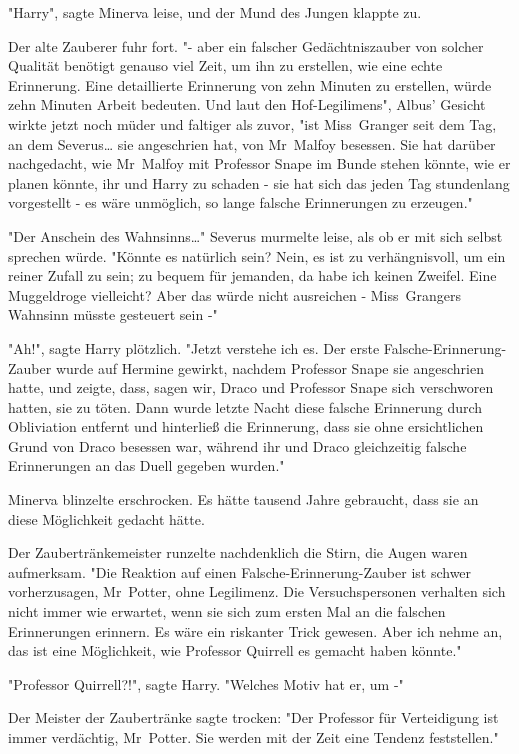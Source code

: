 {"Harry", sagte Minerva leise, und der Mund des Jungen klappte zu.

Der alte Zauberer fuhr fort. "- aber ein falscher Gedächtniszauber von solcher Qualität benötigt genauso viel Zeit, um ihn zu erstellen, wie eine echte Erinnerung. Eine detaillierte Erinnerung von zehn Minuten zu erstellen, würde zehn Minuten Arbeit bedeuten. Und laut den Hof-Legilimens", Albus' Gesicht wirkte jetzt noch müder und faltiger als zuvor, "ist Miss~Granger seit dem Tag, an dem Severus… sie angeschrien hat, von Mr~Malfoy besessen. Sie hat darüber nachgedacht, wie Mr~Malfoy mit Professor Snape im Bunde stehen könnte, wie er planen könnte, ihr und Harry zu schaden - sie hat sich das jeden Tag stundenlang vorgestellt - es wäre unmöglich, so lange falsche Erinnerungen zu erzeugen."

"Der Anschein des Wahnsinns…" Severus murmelte leise, als ob er mit sich selbst sprechen würde. "Könnte es natürlich sein? Nein, es ist zu verhängnisvoll, um ein reiner Zufall zu sein; zu bequem für jemanden, da habe ich keinen Zweifel. Eine Muggeldroge vielleicht? Aber das würde nicht ausreichen - Miss~Grangers Wahnsinn müsste gesteuert sein -"

"Ah!", sagte Harry plötzlich. "Jetzt verstehe ich es. Der erste Falsche-Erinnerung-Zauber wurde auf Hermine gewirkt, nachdem Professor Snape sie angeschrien hatte, und zeigte, dass, sagen wir, Draco und Professor Snape sich verschworen hatten, sie zu töten. Dann wurde letzte Nacht diese falsche Erinnerung durch Obliviation entfernt und hinterließ die Erinnerung, dass sie ohne ersichtlichen Grund von Draco besessen war, während ihr und Draco gleichzeitig falsche Erinnerungen an das Duell gegeben wurden."

Minerva blinzelte erschrocken. Es hätte tausend Jahre gebraucht, dass sie an diese Möglichkeit gedacht hätte.

Der Zaubertränkemeister runzelte nachdenklich die Stirn, die Augen waren aufmerksam. "Die Reaktion auf einen Falsche-Erinnerung-Zauber ist schwer vorherzusagen, Mr~Potter, ohne Legilimenz. Die Versuchspersonen verhalten sich nicht immer wie erwartet, wenn sie sich zum ersten Mal an die falschen Erinnerungen erinnern. Es wäre ein riskanter Trick gewesen. Aber ich nehme an, das ist eine Möglichkeit, wie Professor Quirrell es gemacht haben könnte."

"Professor Quirrell?!", sagte Harry. "Welches Motiv hat er, um -"

Der Meister der Zaubertränke sagte trocken: "Der Professor für Verteidigung ist immer verdächtig, Mr~Potter. Sie werden mit der Zeit eine Tendenz feststellen."

}
